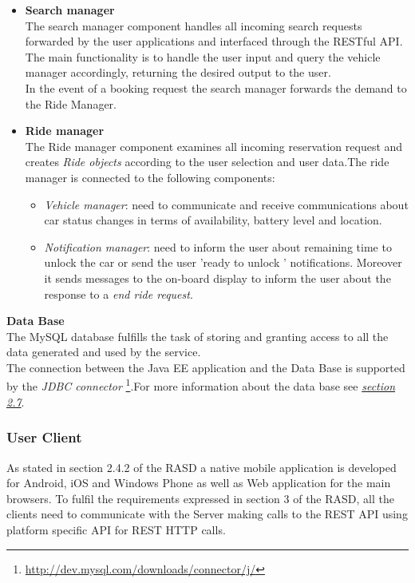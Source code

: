\begin{itemize}
\item \textbf{Search manager}\\
The search manager component handles all incoming search requests forwarded by the user applications and interfaced through the RESTful API. The main functionality is to handle the user input and query the vehicle manager accordingly, returning the desired output to the user.\\In the event of a booking request the search manager forwards the demand to the Ride Manager.

\item \textbf{Ride manager}\\
The Ride manager component examines all incoming reservation request and creates \textit{Ride objects} according to the user selection and user data.The ride manager
is connected to the following components:
\begin{itemize}
\item \textit{Vehicle manager}: need to communicate and receive communications about car status changes in terms of availability, battery level and location.
\item \textit{Notification manager}: need to inform the user about remaining time to unlock the car or send the user 'ready to unlock ' notifications. Moreover it sends messages to the on-board display to inform the user about the response to a \textit{end ride request}.\\[0.4in] 
\end{itemize}
 
\end{itemize}

\textbf{Data Base}\\[0.1in]
The MySQL database fulfills the task of storing and granting access to all
the data generated and used by the service.\\
The connection between the Java EE application and the Data Base is supported
by the \emph{JDBC connector} \footnote{\url{http://dev.mysql.com/downloads/connector/j/}}.For more information about the data base see \hyperref[sec:DMV]{\emph{section 2.7}}.


\subsubsection{User Client}

As stated in section 2.4.2 of the RASD a native mobile application is developed
for Android, iOS and Windows Phone as well as Web application for the main browsers.
To fulfil the requirements expressed in section 3 of the
RASD, all the clients need to communicate with the Server making calls to
the REST API using platform specific API for REST HTTP calls.

